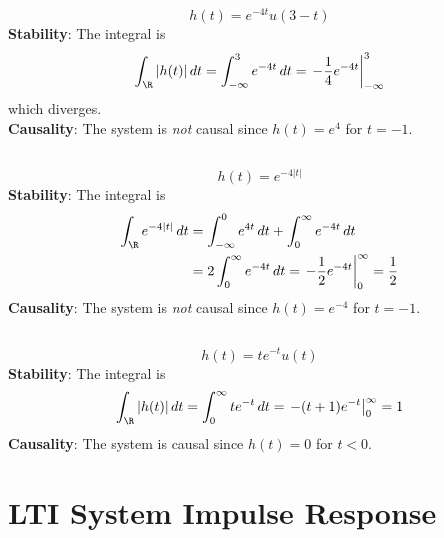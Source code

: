 \documentclass{article}
\begin{document}
\begin{equation}
    h(t) = e^{-4t} u(3 - t)
\end{equation}
\textbf{Stability}: The integral is
\begin{equation}
    \int_{\R} |h(t)| \, dt = \int_{-\infty}^3 e^{-4t} \, dt = \left.-\frac{1}{4} e^{-4t}\right|_{-\infty}^3
\end{equation}
which diverges. \\
\textbf{Causality}: The system is \emph{not} causal since \(h(t) = e^4\) for \(t = -1\).

\subsection{}

\begin{equation}
    h(t) = e^{-4|t|}
\end{equation}
\textbf{Stability}: The integral is
\begin{align}
    \int_{\R} e^{-4|t|} \, dt &= \int_{-\infty}^0 e^{4t} \, dt + \int_0^\infty e^{-4t} \, dt \\
    &= 2 \int_0^\infty e^{-4t} \, dt = \left.-\frac{1}{2} e^{-4t}\right|_0^\infty = \frac{1}{2}
\end{align}
\textbf{Causality}: The system is \emph{not} causal since \(h(t) = e^{-4}\) for \(t = -1\).

\subsection{}

\begin{equation}
    h(t) = t e^{-t} u(t)
\end{equation}
\textbf{Stability}: The integral is
\begin{align}
    \int_{\R} |h(t)| \, dt = \int_0^\infty t e^{-t} \, dt = \left.-(t + 1) e^{-t}\right|_0^\infty = 1
\end{align}
\textbf{Causality}: The system is causal since \(h(t) = 0\) for \(t < 0\).

\section{LTI System Impulse Response}
\end{document}

